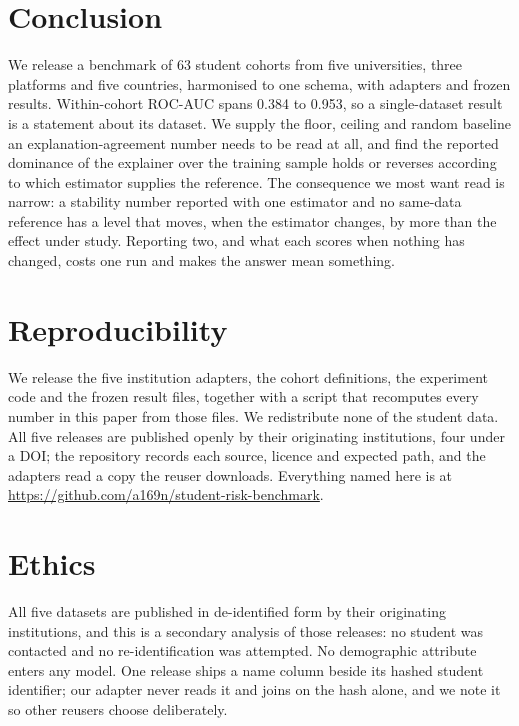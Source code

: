 \documentclass[conference]{IEEEtran}
\newif\ifblind
\begin{document}
\section{Conclusion}

We release a benchmark of 63 student cohorts from five universities, three
platforms and five countries, harmonised to one schema, with adapters and frozen
results. Within-cohort ROC-AUC spans 0.384 to 0.953, so a single-dataset result is a statement about its dataset. We supply the floor, ceiling and random baseline an explanation-agreement number needs to be read at all, and find the reported dominance of the explainer over the training sample holds or reverses according to which estimator supplies the reference. The consequence we most want read is narrow: a stability number reported with one estimator and no same-data reference has a level that moves, when the estimator changes, by more than the effect under study. Reporting two, and what each scores when nothing has changed, costs one run and makes the answer mean something.

\section*{Reproducibility}

We release the five institution adapters, the cohort definitions, the experiment code and the frozen result files, together with a script that recomputes every number in this paper from those files. We redistribute none of the student data. All five releases are published openly by their originating institutions, four under a DOI; the repository records each source, licence and expected path, and the adapters read a copy the reuser downloads. \ifblind An anonymised repository is linked from the submission record; the permanent link replaces this note in the camera-ready version.\else Everything named here is at \url{https://github.com/a169n/student-risk-benchmark}.\fi

\section*{Ethics}

All five datasets are published in de-identified form by their originating institutions, and this is a secondary analysis of those releases: no student was contacted and no re-identification was attempted. No demographic attribute enters any model. One release ships a name column beside its hashed student identifier; our adapter never reads it and joins on the hash alone, and we note it so other reusers choose deliberately.
\end{document}
